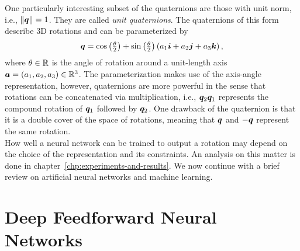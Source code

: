 		One particularly interesting subset of the quaternions are those with unit norm, i.e., $\lVert \bm{q} \rVert = 1$.
		They are called \emph{unit quaternions}.
		The quaternions of this form describe 3D rotations and can be parameterized by
		\begin{equation}
			\bm{q} = 
			\cos\left(\tfrac{\theta}{2}\right) + 
			\sin\left(\tfrac{\theta}{2}\right) \left(a_1 \bm{i} + a_2 \bm{j} + a_3 \bm{k}\right),
		\end{equation}
		where $\theta \in \mathbb{R}$ is the angle of rotation around a unit-length axis $\bm{a} = (a_1, a_2, a_3) \in \mathbb{R}^3$.
		The parameterization makes use of the axis-angle representation, however, quaternions are more powerful in the sense that rotations can be concatenated via multiplication, i.e., $\bm{q}_2 \bm{q}_1$ represents the compound rotation of $\bm{q}_1$ followed by $\bm{q}_2$.
		One drawback of the quaternion is that it is a double cover of the space of rotations, meaning that $\bm{q}$ and $-\bm{q}$ represent the same rotation.
		\\
		
		How well a neural network can be trained to output a rotation may depend on the choice of the representation and its constraints.
		An analysis on this matter is done in chapter~\ref{chp:experiments-and-results}.
		We now continue with a brief review on artificial neural networks and machine learning.
		
	\section{Deep Feedforward Neural Networks}
	
